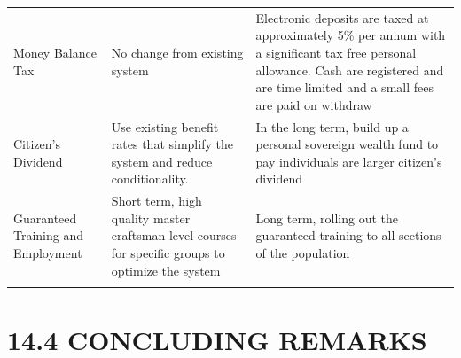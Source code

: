 \documentclass[]{tufte-handout}
\begin{document}
\begin{longtable}[]{@{}lll@{}}
\begin{minipage}[t]{0.20\columnwidth}
Money Balance Tax\strut
\end{minipage} & \begin{minipage}[t]{0.36\columnwidth}\raggedright
No change from existing system\strut
\end{minipage} & \begin{minipage}[t]{0.36\columnwidth}\raggedright
Electronic deposits are taxed at approximately 5\% per annum with a
significant tax free personal allowance. Cash are registered and are
time limited and a small fees are paid on withdraw\strut
\end{minipage}\tabularnewline
\begin{minipage}[t]{0.20\columnwidth}\raggedright
Citizen's Dividend\strut
\end{minipage} & \begin{minipage}[t]{0.36\columnwidth}\raggedright
Use existing benefit rates that simplify the system and reduce
conditionality.\strut
\end{minipage} & \begin{minipage}[t]{0.36\columnwidth}\raggedright
In the long term, build up a personal sovereign wealth fund to pay
individuals are larger citizen's dividend\strut
\end{minipage}\tabularnewline
\begin{minipage}[t]{0.20\columnwidth}\raggedright
Guaranteed Training and Employment\strut
\end{minipage} & \begin{minipage}[t]{0.36\columnwidth}\raggedright
Short term, high quality master craftsman level courses for specific
groups to optimize the system\strut
\end{minipage} & \begin{minipage}[t]{0.36\columnwidth}\raggedright
Long term, rolling out the guaranteed training to all sections of the
population\strut
\end{minipage}\tabularnewline
\begin{minipage}[t]{0.20\columnwidth}\raggedright
\strut
\end{minipage} & \begin{minipage}[t]{0.36\columnwidth}\raggedright
\strut
\end{minipage} & \begin{minipage}[t]{0.36\columnwidth}\raggedright
\strut
\end{minipage}\tabularnewline
\bottomrule
\end{longtable}

\hypertarget{concluding-remarks}{%
\section{14.4 CONCLUDING REMARKS}\label{concluding-remarks}}
\end{document}
